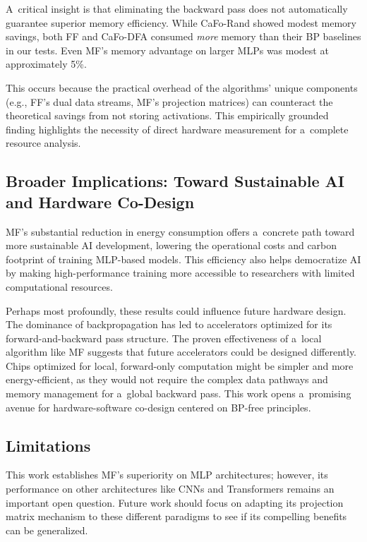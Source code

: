 \documentclass[letterpaper]{article}
\begin{document}
A~critical insight is that eliminating the backward pass does not automatically guarantee superior memory efficiency. While CaFo-Rand showed modest memory savings, both FF and CaFo-DFA consumed \emph{more} memory than their BP baselines in our tests. Even MF's memory advantage on larger MLPs was modest at approximately 5\%.

This occurs because the practical overhead of the algorithms' unique components (e.g., FF's dual data streams, MF's projection matrices) can counteract the theoretical savings from not storing activations. This empirically grounded finding highlights the necessity of direct hardware measurement for a~complete resource analysis.

\subsection{Broader Implications: Toward Sustainable AI and Hardware Co-Design}

MF's substantial reduction in energy consumption offers a~concrete path toward more sustainable AI development, lowering the operational costs and carbon footprint of training MLP-based models. This efficiency also helps democratize AI by making high-performance training more accessible to researchers with limited computational resources.

Perhaps most profoundly, these results could influence future hardware design. The dominance of backpropagation has led to accelerators optimized for its forward-and-backward pass structure. The proven effectiveness of a~local algorithm like MF suggests that future accelerators could be designed differently. Chips optimized for local, forward-only computation might be simpler and more energy-efficient, as they would not require the complex data pathways and memory management for a~global backward pass. This work opens a~promising avenue for hardware-software co-design centered on BP-free principles.

\subsection{Limitations}

This work establishes MF's superiority on MLP architectures; however, its performance on other architectures like CNNs and Transformers remains an important open question. Future work should focus on adapting its projection matrix mechanism to these different paradigms to see if its compelling benefits can be generalized.
\end{document}
